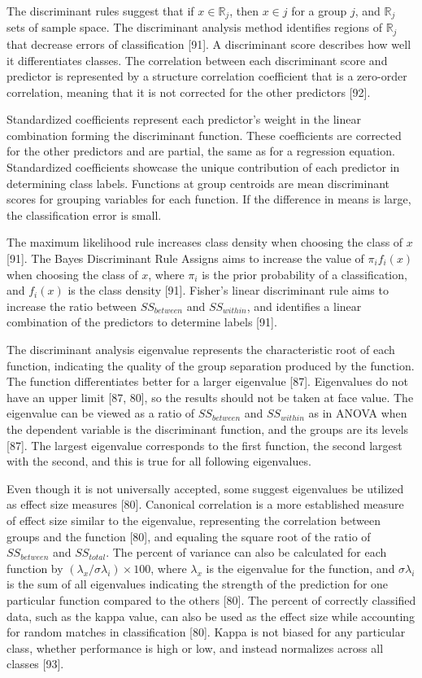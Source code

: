 \documentclass[preprint,12pt]{elsarticle}
\begin{document}
The discriminant rules suggest that if $x\in \mathbb{R}_{j}$, then $x\in j$ for a group $j$, and $\mathbb{R}_{j}$ sets of sample space. The discriminant analysis method identifies regions of $\mathbb{R}_{j}$ that decrease errors of classification [91].
A discriminant score describes how well it differentiates classes.
The correlation between each discriminant score and predictor is represented by a structure correlation coefficient that is a zero-order correlation, meaning that it is not corrected for the other predictors [92].


Standardized coefficients represent each predictor's weight in the linear combination forming the discriminant function. These coefficients are corrected for the other predictors and are partial, the same as for a regression equation. Standardized coefficients showcase the unique contribution of each predictor in determining class labels. Functions at group centroids are mean discriminant scores for grouping variables for each function. If the difference in means is large, the classification error is small.

The maximum likelihood rule increases class density when choosing the class of $x$ [91].
The Bayes Discriminant Rule Assigns aims to increase the value of $\pi_{i}f_{i}(x)$ when choosing the class of $x$, where $\pi_{i}$ is the prior probability of a classification, and $f_{i}(x)$ is the class density [91]. Fisher's linear discriminant rule aims to increase the ratio between $SS_{between}$ and $SS_{within}$, and identifies a linear combination of the predictors to determine labels [91].

The discriminant analysis eigenvalue represents the characteristic root of each function, indicating the quality of the group separation produced by the function. The function differentiates better for a larger eigenvalue [87]. Eigenvalues do not have an upper limit [87, 80], so the results should not be taken at face value. The eigenvalue can be viewed as a ratio of $SS_{between}$ and $SS_{within}$ as in ANOVA when the dependent variable is the discriminant function, and the groups are its levels [87]. The largest eigenvalue corresponds to the first function, the second largest with the second, and this is true for all following eigenvalues.

Even though it is not universally accepted, some suggest eigenvalues be utilized as effect size measures [80]. Canonical correlation is a more established measure of effect size similar to the eigenvalue, representing the correlation between groups and the function [80], and equaling the square root of the ratio of $SS_{between}$ and $SS_{total}$. The percent of variance can also be calculated for each function by $(\lambda_{x}/\sigma\lambda_{i}) \times 100$, where $\lambda_{x}$ is the eigenvalue for the function, and $\sigma\lambda_{i}$ is the sum of all eigenvalues indicating the strength of the prediction for one particular function compared to the others [80]. The percent of correctly classified data, such as the kappa value, can also be used as the effect size while accounting for random matches in classification [80]. Kappa is not biased for any particular class, whether performance is high or low, and instead normalizes across all classes [93]. 
\end{document}
